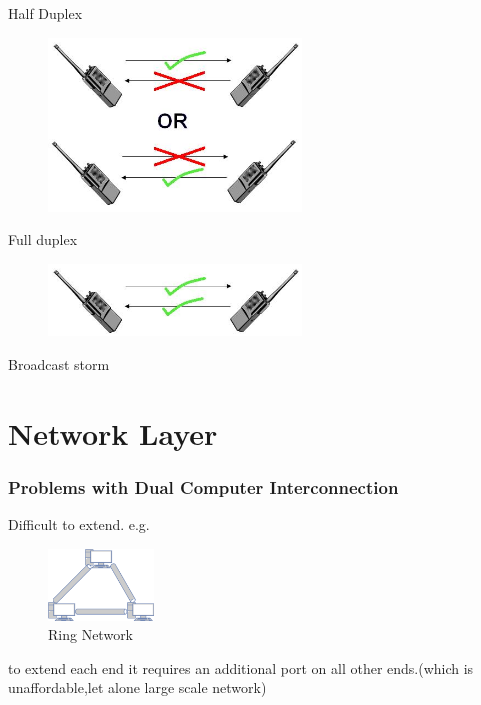 \documentclass[UTF8]{ctexbeamer}
\begin{document}
\begin{frame}{Half Duplex}
    \begin{figure}
        \centering
        \includegraphics[width=0.6\textwidth]{HalfDuplex.jpg}
    \end{figure}
\end{frame}
\begin{frame}{Full duplex}
    \begin{figure}
        \centering
        \includegraphics[width=0.6\textwidth]{FullDuplex.jpg}
    \end{figure}
\end{frame}
\begin{frame}{Broadcast storm}
\end{frame}
\section{Network Layer}
\begin{frame}
	\frametitle{Problems with Dual Computer Interconnection}
	Difficult to extend.
   	e.g.
	\begin{figure}
	    \centering
	    \includegraphics[width=0.25\textwidth]{extension-difficulty.png}
	    \caption{Ring Network}
   \end{figure}
   
    to extend each end it requires an additional port on all other ends.(which is unaffordable,let alone large scale network)
\end{frame}
\end{document}
